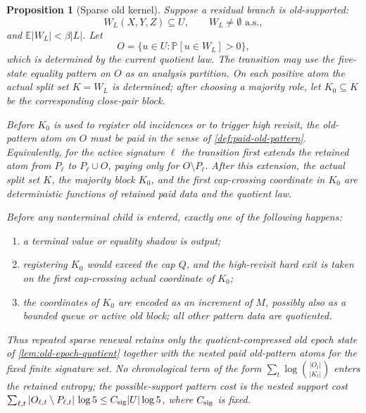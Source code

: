 \documentclass[11pt]{article}
\newcommand{\Cref}[1]{\ref{#1}}
\newtheorem{proposition}[theorem]{Proposition}
\theoremstyle{remark}
\newcommand{\E}{\mathbb E}
\newcommand{\Prob}{\mathbb P}
\begin{document}
\begin{proposition}[Sparse old kernel]\label{prop:sparse-old}
Suppose a residual branch is old-supported:
\[
        W_L(X,Y,Z)\subseteq U,
        \qquad W_L\ne\emptyset \text{ a.s.},
\]
and $\E|W_L|<\beta |L|$.  Let
\[
        O=\{u\in U:\Prob[u\in W_L]>0\},
\]
which is determined by the current quotient law.  The transition may use the five-state equality pattern on $O$ as an analysis partition.  On each positive atom the actual split set $K=W_L$ is determined; after choosing a majority role, let $K_0\subseteq K$ be the corresponding close-pair block.

Before $K_0$ is used to register old incidences or to trigger high revisit, the old-pattern atom on $O$ must be paid in the sense of \Cref{def:paid-old-pattern}.  Equivalently, for the active signature $\ell$ the transition first extends the retained atom from $P_\ell$ to $P_\ell\cup O$, paying only for $O\setminus P_\ell$.  After this extension, the actual split set $K$, the majority block $K_0$, and the first cap-crossing coordinate in $K_0$ are deterministic functions of retained paid data and the quotient law.

Before any nonterminal child is entered, exactly one of the following happens:
\begin{enumerate}[label=\textup{(\roman*)}]
\item a terminal value or equality shadow is output;
\item registering $K_0$ would exceed the cap $Q$, and the high-revisit hard exit is taken on the first cap-crossing actual coordinate of $K_0$;
\item the coordinates of $K_0$ are encoded as an increment of $M$, possibly also as a bounded queue or active old block; all other pattern data are quotiented.
\end{enumerate}
Thus repeated sparse renewal retains only the quotient-compressed old epoch state of \Cref{lem:old-epoch-quotient} together with the nested paid old-pattern atoms for the fixed finite signature set.  No chronological term of the form $\sum_t\log\binom{|O_t|}{|K_t|}$ enters the retained entropy; the possible-support pattern cost is the nested support cost $\sum_{\ell,t} |O_{\ell,t}\setminus P_{\ell,t}|\,\log 5\le C_{\rm sig}|U|\log 5$, where $C_{\rm sig}$ is fixed.
\end{proposition}
\end{document}
